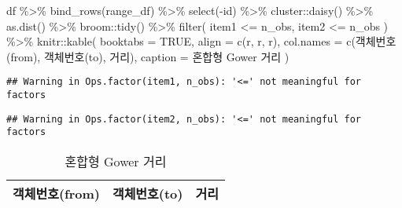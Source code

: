 \documentclass[
]{book}
\newenvironment{Shaded}{\begin{snugshade}}{\end{snugshade}}
\newcommand{\AttributeTok}[1]{\textcolor[rgb]{0.77,0.63,0.00}{#1}}
\newcommand{\ConstantTok}[1]{\textcolor[rgb]{0.00,0.00,0.00}{#1}}
\newcommand{\FunctionTok}[1]{\textcolor[rgb]{0.00,0.00,0.00}{#1}}
\newcommand{\NormalTok}[1]{#1}
\newcommand{\SpecialCharTok}[1]{\textcolor[rgb]{0.00,0.00,0.00}{#1}}
\newcommand{\StringTok}[1]{\textcolor[rgb]{0.31,0.60,0.02}{#1}}
\begin{document}
\begin{Shaded}
\begin{Highlighting}[]
\NormalTok{df }\SpecialCharTok{\%\textgreater{}\%}
  \FunctionTok{bind\_rows}\NormalTok{(range\_df) }\SpecialCharTok{\%\textgreater{}\%}
  \FunctionTok{select}\NormalTok{(}\SpecialCharTok{{-}}\NormalTok{id) }\SpecialCharTok{\%\textgreater{}\%}
\NormalTok{  cluster}\SpecialCharTok{::}\FunctionTok{daisy}\NormalTok{() }\SpecialCharTok{\%\textgreater{}\%}
  \FunctionTok{as.dist}\NormalTok{() }\SpecialCharTok{\%\textgreater{}\%}
\NormalTok{  broom}\SpecialCharTok{::}\FunctionTok{tidy}\NormalTok{() }\SpecialCharTok{\%\textgreater{}\%}
  \FunctionTok{filter}\NormalTok{(}
\NormalTok{    item1 }\SpecialCharTok{\textless{}=}\NormalTok{ n\_obs,}
\NormalTok{    item2 }\SpecialCharTok{\textless{}=}\NormalTok{ n\_obs}
\NormalTok{  ) }\SpecialCharTok{\%\textgreater{}\%}
\NormalTok{  knitr}\SpecialCharTok{::}\FunctionTok{kable}\NormalTok{(}
    \AttributeTok{booktabs =} \ConstantTok{TRUE}\NormalTok{,}
    \AttributeTok{align =} \FunctionTok{c}\NormalTok{(}\StringTok{\textquotesingle{}r\textquotesingle{}}\NormalTok{, }\StringTok{\textquotesingle{}r\textquotesingle{}}\NormalTok{, }\StringTok{\textquotesingle{}r\textquotesingle{}}\NormalTok{),}
    \AttributeTok{col.names =} \FunctionTok{c}\NormalTok{(}\StringTok{\textquotesingle{}객체번호(from)\textquotesingle{}}\NormalTok{, }\StringTok{\textquotesingle{}객체번호(to)\textquotesingle{}}\NormalTok{, }\StringTok{\textquotesingle{}거리\textquotesingle{}}\NormalTok{),}
    \AttributeTok{caption =} \StringTok{\textquotesingle{}혼합형 Gower 거리\textquotesingle{}}
\NormalTok{  )}
\end{Highlighting}
\end{Shaded}

\begin{verbatim}
## Warning in Ops.factor(item1, n_obs): '<=' not meaningful for factors
\end{verbatim}

\begin{verbatim}
## Warning in Ops.factor(item2, n_obs): '<=' not meaningful for factors
\end{verbatim}

\begin{table}

\caption{\label{tab:mixed-gower}혼합형 Gower 거리}
\centering
\begin{tabular}[t]{rrr}
\toprule
객체번호(from) & 객체번호(to) & 거리\\


\bottomrule
\end{tabular}
\end{table}
\end{document}
